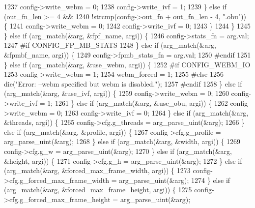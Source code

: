 \begin{DoxyCodeInclude}
{{{{{{{{{{{{{{{{1237           config->write\_webm = 0;
1238           config->write\_ivf = 1;
1239         \} \textcolor{keywordflow}{else} \textcolor{keywordflow}{if} (out\_fn\_len >= 4 &&
1240             !strcmp(config->out\_fn + out\_fn\_len - 4, \textcolor{stringliteral}{".obu"})) \{
1241           config->write\_webm = 0;
1242           config->write\_ivf = 0;
1243         \}
1244       \}
1245     \} \textcolor{keywordflow}{else} \textcolor{keywordflow}{if} (arg\_match(&arg, &fpf\_name, argi)) \{
1246       config->stats\_fn = arg.val;
1247 \textcolor{preprocessor}{#if CONFIG\_FP\_MB\_STATS}
1248     \} \textcolor{keywordflow}{else} \textcolor{keywordflow}{if} (arg\_match(&arg, &fpmbf\_name, argi)) \{
1249       config->fpmb\_stats\_fn = arg.val;
1250 \textcolor{preprocessor}{#endif}
1251     \} \textcolor{keywordflow}{else} \textcolor{keywordflow}{if} (arg\_match(&arg, &use\_webm, argi)) \{
1252 \textcolor{preprocessor}{#if CONFIG\_WEBM\_IO}
1253       config->write\_webm = 1;
1254       webm\_forced = 1;
1255 \textcolor{preprocessor}{#else}
1256       die(\textcolor{stringliteral}{"Error: --webm specified but webm is disabled."});
1257 \textcolor{preprocessor}{#endif}
1258     \} \textcolor{keywordflow}{else} \textcolor{keywordflow}{if} (arg\_match(&arg, &use\_ivf, argi)) \{
1259       config->write\_webm = 0;
1260       config->write\_ivf = 1;
1261     \} \textcolor{keywordflow}{else} \textcolor{keywordflow}{if} (arg\_match(&arg, &use\_obu, argi)) \{
1262       config->write\_webm = 0;
1263       config->write\_ivf = 0;
1264     \} \textcolor{keywordflow}{else} \textcolor{keywordflow}{if} (arg\_match(&arg, &threads, argi)) \{
1265       config->cfg.g\_threads = arg\_parse\_uint(&arg);
1266     \} \textcolor{keywordflow}{else} \textcolor{keywordflow}{if} (arg\_match(&arg, &profile, argi)) \{
1267       config->cfg.g\_profile = arg\_parse\_uint(&arg);
1268     \} \textcolor{keywordflow}{else} \textcolor{keywordflow}{if} (arg\_match(&arg, &width, argi)) \{
1269       config->cfg.g\_w = arg\_parse\_uint(&arg);
1270     \} \textcolor{keywordflow}{else} \textcolor{keywordflow}{if} (arg\_match(&arg, &height, argi)) \{
1271       config->cfg.g\_h = arg\_parse\_uint(&arg);
1272     \} \textcolor{keywordflow}{else} \textcolor{keywordflow}{if} (arg\_match(&arg, &forced\_max\_frame\_width, argi)) \{
1273       config->cfg.g\_forced\_max\_frame\_width = arg\_parse\_uint(&arg);
1274     \} \textcolor{keywordflow}{else} \textcolor{keywordflow}{if} (arg\_match(&arg, &forced\_max\_frame\_height, argi)) \{
1275       config->cfg.g\_forced\_max\_frame\_height = arg\_parse\_uint(&arg);
}}}}}}}}}}}}}}}}
\end{DoxyCodeInclude}
